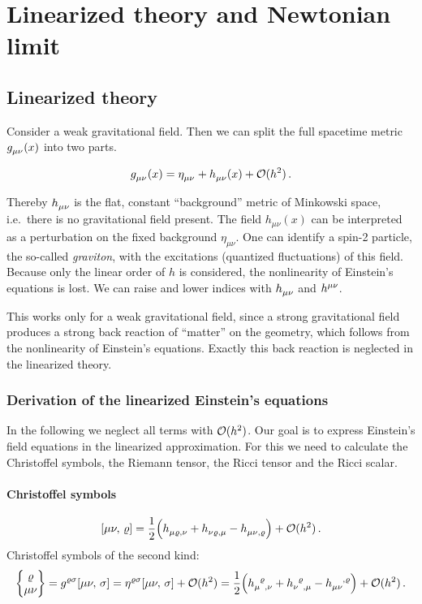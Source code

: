 \chapter{Linearized theory and Newtonian limit}
\section{Linearized theory}
Consider a weak gravitational field. Then we can split the full spacetime metric $\tensor{g}{_\mu_\nu}(x)$ into two parts.
\begin{definition}
    \begin{equation}
        \tensor{g}{_\mu_\nu}(x) = \tensor{\eta}{_\mu_\nu} +
        \tensor{h}{_\mu_\nu}(x) + \landauO(h^2) \, .
    \end{equation}
\end{definition}
Thereby $\tensor{h}{_\mu_\nu}$ is the flat, constant ``background'' metric of Minkowski
space, i.e.\ there is no gravitational field present.
The field $h_{\mu\nu}(x)$ can be interpreted as a perturbation on the fixed background $\eta_{\mu\nu}$.
One can identify a spin-2 particle, the so-called \emph{graviton}, with the excitations (quantized fluctuations) of this field.
Because only the linear order of $h$ is considered, the nonlinearity of Einstein's equations is lost.
We can raise and lower indices with $\tensor{h}{_\mu_\nu}$ and
$\tensor{h}{^\mu^\nu}$.

\begin{remark}
This works only for a weak gravitational field, since a strong gravitational field produces a strong back reaction of ``matter''
on the geometry, which follows from the nonlinearity of Einstein's equations.
Exactly this back reaction is neglected in the linearized theory.
\end{remark}

\subsection{Derivation of the linearized Einstein's equations}
In the following we neglect all terms with $\mathcal{O}(h^2)$.
Our goal is to express Einstein's field equations in the linearized approximation.
For this we need to calculate the Christoffel symbols, the Riemann tensor, the Ricci tensor and the Ricci scalar.

\subsubsection*{Christoffel symbols}
\begin{equation}
    \csym{\mu}{\nu}{\varrho} = \frac{1}{2} \left( \tensor{h}{_\mu_\varrho_,_\nu} + \tensor{h}{_\nu_\varrho_,_\mu}
    - \tensor{h}{_\mu_\nu_,_\varrho} \right) + \landauO(h^2) \, .
\end{equation}
Christoffel symbols of the second kind:
\begin{equation}
    \cSym{\varrho}{\mu}{\nu} = g^{\varrho\sigma} \csym{\mu}{\nu}{\sigma} = \eta^{\varrho\sigma} \csym{\mu}{\nu}{\sigma} + \landauO(h^2)
    = \frac{1}{2} \left( \tensor{h}{_\mu^\varrho_,_\nu} + \tensor{h}{_\nu^\varrho_,_\mu} - \tensor{h}{_\mu_\nu^,^\varrho} \right) + \landauO(h^2) \, .
\end{equation}
